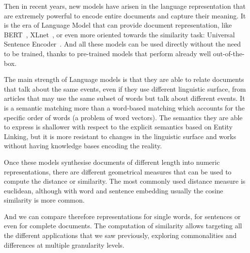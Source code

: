 Then in recent years, new models have arisen in the language representation that are extremely powerful to encode entire documents and capture their meaning. It is the
era of
Language Model that can provide document representation, like BERT~\cite{devlin2018bert}, XLnet~\cite{yang2019xlnet}, or even more oriented towards the similarity task: Universal Sentence Encoder~\cite{cer2018universal}.
And all these models can be used directly without the need to be trained, thanks to pre-trained models that perform already well out-of-the-box.

The main strength of Language models is that they are able to
relate documents that talk about the same events, even if they use different linguistic surface, from articles that may use the same subset of words but talk about different events.
It is a semantic matching more than a word-based matching which accounts for the specific order of words (a problem of word vectors). 
The semantics they are able to express
is shallower with respect to the explicit semantics based on Entity Linking, but it is more resistant to changes in the linguistic surface and works without having knowledge bases encoding the reality.










Once these models synthesise documents of different length into numeric representations, there are different geometrical measures that can be used to compute the distance or similarity.
The most commonly used distance measure is euclidean, although with word and sentence embedding usually the cosine similarity is more common.

And we can compare therefore representations for single words, for sentences or even for complete documents.
The computation of similarity allows targeting all the different applications that we saw previously, exploring commonalities and differences at multiple granularity levels.



